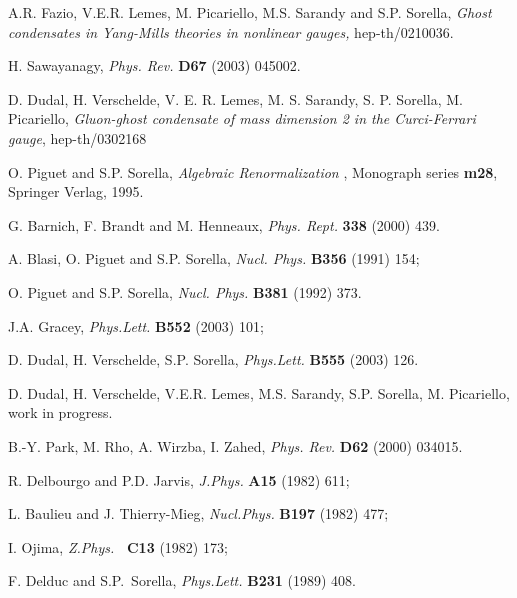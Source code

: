 \documentclass[a4paper,12pt]{article}
\begin{document}
\begin{thebibliography}{99}
  A.R. Fazio, V.E.R. Lemes, M. Picariello, M.S. Sarandy and
S.P. Sorella, \emph{Ghost condensates in Yang-Mills theories in nonlinear
gauges, }hep-th/0210036.\myHighlight{$\emph{\ }$}\coordHE{}

  H. Sawayanagy, \emph{Phys. Rev. }\textbf{D67} (2003) 045002.

  D. Dudal, H. Verschelde, V. E. R. Lemes, M. S. Sarandy, S. P.
Sorella, M. Picariello, \emph{Gluon-ghost condensate of mass dimension 2 in
the Curci-Ferrari gauge}, hep-th/0302168

  O. Piguet and S.P. Sorella, \emph{Algebraic Renormalization}%
, Monograph series \textbf{m28}, Springer Verlag, 1995.\emph{\ }

  G. Barnich, F. Brandt and M. Henneaux, \emph{Phys. Rept.} 
\textbf{338 }(2000) 439.

  A. Blasi, O. Piguet and S.P. Sorella, \emph{Nucl. Phys. }%
\textbf{B356 }(1991) 154;

O. Piguet and S.P. Sorella, \emph{Nucl. Phys. }\textbf{B381 }(1992) 373.

  J.A. Gracey, \emph{Phys.Lett.} \textbf{B552} (2003) 101;

  D. Dudal, H. Verschelde, S.P. Sorella, \emph{Phys.Lett.} 
\textbf{B555} (2003) 126.

  D. Dudal, H. Verschelde, V.E.R. Lemes, M.S. Sarandy, S.P.
Sorella, M. Picariello, work in progress.

  B.-Y. Park, M. Rho, A. Wirzba, I. Zahed, \emph{Phys. Rev. }%
\textbf{D62} (2000) 034015.

  R. Delbourgo and P.D. Jarvis, \emph{J.Phys. }\textbf{A15}
(1982) 611;

L. Baulieu and J. Thierry-Mieg, \emph{Nucl.Phys. }\textbf{B197 }(1982) 477;

I. Ojima, \emph{Z.Phys. }\textbf{\ C13} (1982) 173;

F. Delduc and S.P.\ Sorella, \emph{Phys.Lett. }\textbf{B231} (1989) 408.
\end{thebibliography}
\end{document}
